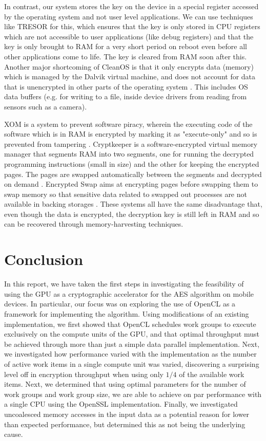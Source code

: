 \documentclass[conference,10pt]{IEEEtran}
\begin{document}
In contrast, our system stores the key on the device in a special register accessed by the operating 
system and not user level applications. We can use techniques like TRESOR \cite{tresor} for this, 
which ensures that the key is only stored in CPU registers which are not accessible to user 
applications (like debug registers) and that the key is only brought to RAM for a very short period 
on reboot even before all other applications come to life. The key is cleared from RAM soon after 
this.  Another major shortcoming of CleanOS is that it only encrypts data (memory) which is managed 
by the Dalvik virtual machine, and does not account for data that is unencrypted in other parts of 
the operating system \cite{cleanos}.  This includes OS data buffers (e.g. for writing to a file, 
inside device drivers from reading from sensors such as a camera).

XOM is a system to prevent software piracy, wherein the executing code of the software which is in 
RAM is encrypted by marking it as "execute-only" and so is prevented from tampering \cite{xom}.  
Cryptkeeper is a software-encrypted virtual memory manager that segments RAM into two segments, one 
for running the decrypted programming instructions (small in size) and the other for keeping the 
encrypted pages. The pages are swapped automatically between the segments and decrypted on demand 
\cite{cryptkeeper}.  Encrypted Swap aims at encrypting pages before swapping them to swap memory so 
that sensitive data related to swapped out processes are not available in backing storages 
\cite{encryptedswap}. These systems all have the same disadvantage that, even though the data is 
encrypted, the decryption key is still left in RAM and so can be recovered through memory-harvesting 
techniques.

\section{Conclusion}

In this report, we have taken the first steps in investigating the feasibility of using the GPU as a 
cryptographic accelerator for the AES algorithm on mobile devices.  In particular, our focus was on 
exploring the use of OpenCL as a framework for implementing the algorithm.  Using modifications of 
an existing implementation, we first showed that OpenCL schedules work groups to execute exclusively 
on the compute units of the GPU, and that optimal throughput must be achieved through more than just 
a simple data parallel implementation. Next, we investigated how performance varied with the 
implementation as the number of active work items in a single compute unit was varied, discovering a 
surprising level off in encryption throughput when using only $1/4$ of the available work 
items.  Next, we determined that using optimal parameters for the number of work groups and work 
group size, we are able to achieve on par performance with a single CPU using the OpenSSL 
implementation.  Finally, we investigated uncoalesced memory accesses in the input data as a 
potential reason for lower than expected performance, but determined this as not being the 
underlying cause.  
\end{document}

